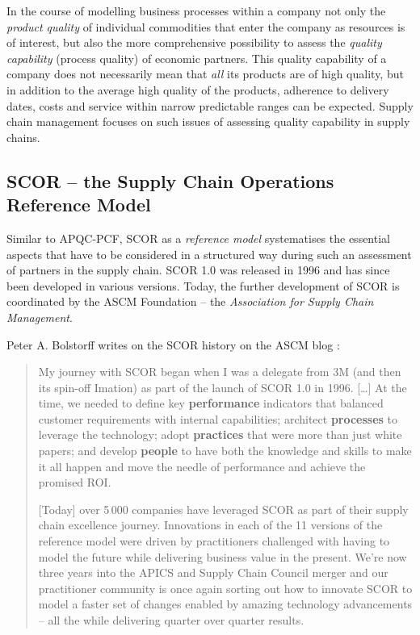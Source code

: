 \documentclass[11pt,a4paper]{article}
\begin{document}
In the course of modelling business processes within a company not only the
\emph{product quality} of individual commodities that enter the company as
resources is of interest, but also the more comprehensive possibility to
assess the \emph{quality capability} (process quality) of economic partners.
This quality capability of a company does not necessarily mean that \emph{all}
its products are of high quality, but in addition to the average high quality
of the products, adherence to delivery dates, costs and service within narrow
predictable ranges can be expected. Supply chain management focuses on such
issues of assessing quality capability in supply chains.

\subsection{SCOR -- the Supply Chain Operations Reference Model}

Similar to APQC-PCF, SCOR as a \emph{reference model} systematises the
essential aspects that have to be considered in a structured way during such
an assessment of partners in the supply chain.  SCOR 1.0 was released in 1996
and has since been developed in various versions. Today, the further
development of SCOR is coordinated by the ASCM Foundation -- the
\emph{Association for Supply Chain Management}.

Peter A. Bolstorff writes on the SCOR history on the ASCM blog
\cite{Bolstorff2017}:
\begin{quote}
  My journey with SCOR began when I was a delegate from 3M (and then its
  spin-off Imation) as part of the launch of SCOR 1.0 in 1996. [\ldots] At the
  time, we needed to define key \textbf{performance} indicators that balanced
  customer requirements with internal capabilities; architect
  \textbf{processes} to leverage the technology; adopt \textbf{practices} that
  were more than just white papers; and develop \textbf{people} to have both
  the knowledge and skills to make it all happen and move the needle of
  performance and achieve the promised ROI.

  [Today] over 5\,000 companies have leveraged SCOR as part of their supply
  chain excellence journey. Innovations in each of the 11 versions of the
  reference model were driven by practitioners challenged with having to model
  the future while delivering business value in the present. We’re now three
  years into the APICS and Supply Chain Council merger and our practitioner
  community is once again sorting out how to innovate SCOR to model a faster
  set of changes enabled by amazing technology advancements – all the while
  delivering quarter over quarter results.
\end{quote}
\end{document}
